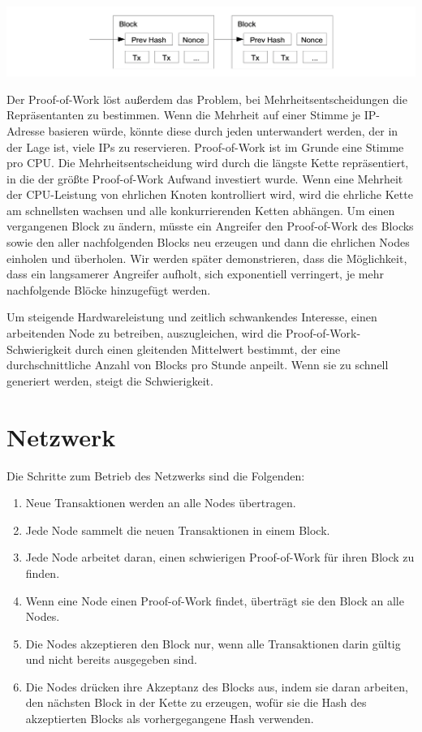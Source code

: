 \documentclass[9pt]{article}
\begin{document}
	\begin{center}
		\includegraphics[scale=0.3]{pics/proofofwork.png}	
	\end{center}
	
	Der Proof-of-Work löst außerdem das Problem, bei Mehrheitsentscheidungen die Repräsentanten zu bestimmen. Wenn die Mehrheit auf einer Stimme je IP-Adresse basieren würde, könnte diese durch jeden unterwandert werden, der in der Lage ist, viele IPs zu reservieren. Proof-of-Work ist im Grunde eine Stimme pro CPU. Die Mehrheitsentscheidung wird durch die längste Kette repräsentiert, in die der größte Proof-of-Work Aufwand investiert wurde. Wenn eine Mehrheit der CPU-Leistung von ehrlichen Knoten kontrolliert wird, wird die ehrliche Kette am schnellsten wachsen und alle konkurrierenden Ketten abhängen. Um einen vergangenen Block zu ändern, müsste ein Angreifer den Proof-of-Work des Blocks sowie den aller nachfolgenden Blocks neu erzeugen und dann die ehrlichen Nodes einholen und überholen. Wir werden später demonstrieren, dass die Möglichkeit, dass ein langsamerer Angreifer aufholt, sich exponentiell verringert, je mehr nachfolgende Blöcke hinzugefügt werden.

	Um steigende Hardwareleistung und zeitlich schwankendes Interesse, einen arbeitenden Node zu betreiben, auszugleichen, wird die Proof-of-Work-Schwierigkeit durch einen gleitenden Mittelwert bestimmt, der eine durchschnittliche Anzahl von Blocks pro Stunde anpeilt. Wenn sie zu schnell generiert werden, steigt die Schwierigkeit.
	
	\section{Netzwerk}
	
	Die Schritte zum Betrieb des Netzwerks sind die Folgenden:
	
	\begin{enumerate}[label={\arabic*)}, topsep=0pt, itemsep=-1ex, partopsep=1ex, parsep=1ex]
		\item Neue Transaktionen werden an alle Nodes übertragen.
		\item Jede Node sammelt die neuen Transaktionen in einem Block.
		\item Jede Node arbeitet daran, einen schwierigen Proof-of-Work für ihren Block zu finden.
		\item Wenn eine Node einen Proof-of-Work findet, überträgt sie den Block an alle Nodes.
		\item Die Nodes akzeptieren den Block nur, wenn alle Transaktionen darin gültig und nicht bereits ausgegeben sind.
		\item Die Nodes drücken ihre Akzeptanz des Blocks aus, indem sie daran arbeiten, den nächsten Block in der Kette zu erzeugen, wofür sie die Hash des akzeptierten Blocks als vorhergegangene Hash verwenden.
	\end{enumerate}
	
\end{document}
